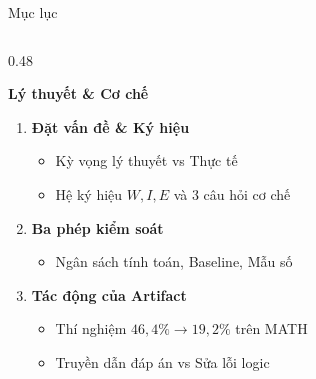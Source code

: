 \documentclass[aspectratio=169,10pt]{beamer}
\begin{document}
\begin{frame}{Mục lục}
  \begin{columns}[t]
    \begin{column}{0.48\textwidth}
      \begin{block}{\textbf{Lý thuyết \& Cơ chế}}
        \begin{enumerate}
          \item[\textbf{I.}] \textbf{Đặt vấn đề \& Ký hiệu}
          \begin{itemize}\footnotesize
            \item Kỳ vọng lý thuyết vs Thực tế
            \item Hệ ký hiệu $W, I, E$ và 3 câu hỏi cơ chế
          \end{itemize}
          \item[\textbf{II.}] \textbf{Ba phép kiểm soát}
          \begin{itemize}\footnotesize
            \item Ngân sách tính toán, Baseline, Mẫu số
          \end{itemize}
          \item[\textbf{III.}] \textbf{Tác động của Artifact}
          \begin{itemize}\footnotesize
            \item Thí nghiệm $46{,}4\% \to 19{,}2\%$ trên MATH
            \item Truyền dẫn đáp án vs Sửa lỗi logic
          \end{itemize}
        \end{enumerate}
      \end{block}
    \end{column}
    

\end{columns}
\end{frame}
\end{document}
